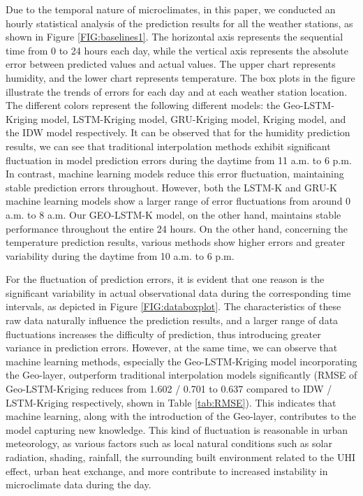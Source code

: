 \documentclass[a4paper,fleqn]{cas-sc}
\begin{document}
Due to the temporal nature of microclimates, in this paper, we conducted an hourly statistical analysis of the prediction results for all the weather stations, as shown in Figure \ref{FIG:baselines1}. The horizontal axis represents the sequential time from 0 to 24 hours each day, while the vertical axis represents the absolute error between predicted values and actual values. The upper chart represents humidity, and the lower chart represents temperature. The box plots in the figure illustrate the trends of errors for each day and at each weather station location. The different colors represent the following different models: the Geo-LSTM-Kriging model, LSTM-Kriging model, GRU-Kriging model, Kriging model, and the IDW model respectively. It can be observed that for the humidity prediction results, we can see that traditional interpolation methods exhibit significant fluctuation in model prediction errors during the daytime from 11 a.m. to 6 p.m. In contrast, machine learning models reduce this error fluctuation, maintaining stable prediction errors throughout. However, both the LSTM-K and GRU-K machine learning models show a larger range of error fluctuations from around 0 a.m. to 8 a.m. Our GEO-LSTM-K model, on the other hand, maintains stable performance throughout the entire 24 hours. On the other hand, concerning the temperature prediction results, various methods show higher errors and greater variability during the daytime from 10 a.m. to 6 p.m. 

For the fluctuation of prediction errors, it is evident that one reason is the significant variability in actual observational data during the corresponding time intervals, as depicted in Figure \ref{FIG:databoxplot}. The characteristics of these raw data naturally influence the prediction results, and a larger range of data fluctuations increases the difficulty of prediction, thus introducing greater variance in prediction errors. However, at the same time, we can observe that machine learning methods, especially the Geo-LSTM-Kriging model incorporating the Geo-layer, outperform traditional interpolation models significantly (RMSE of Geo-LSTM-Kriging reduces from 1.602 / 0.701 to 0.637 compared to IDW / LSTM-Kriging respectively, shown in Table \ref{tab:RMSE}). This indicates that machine learning, along with the introduction of the Geo-layer, contributes to the model capturing new knowledge. This kind of fluctuation is reasonable in urban meteorology, as various factors such as local natural conditions such as solar radiation, shading, rainfall, the surrounding built environment related to the UHI effect, urban heat exchange, and more contribute to increased instability in microclimate data during the day. 
\end{document}

